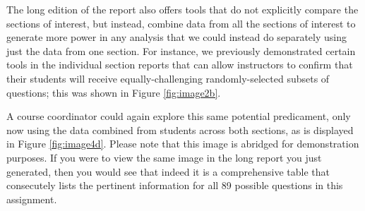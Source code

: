 \documentclass{article}\usepackage[]{graphicx}\usepackage[]{color}
\numberwithin{equation}{section} %
\begin{document}
\begin{center}
\captionsetup{width=0.55\textwidth}
\label{fig:image4c}
\end{center}

The long edition of the report also offers tools that do not explicitly compare the sections of interest, but instead, combine data from all the sections of interest to generate more power in any analysis that we could instead do separately using just the data from one section. For instance, we previously demonstrated certain tools in the individual section reports that can allow instructors to confirm that their students will receive equally-challenging randomly-selected subsets of questions; this was shown in Figure \ref{fig:image2b}.

A course coordinator could again explore this same potential predicament, only now using the data combined from students across both sections, as is displayed in Figure \ref{fig:image4d}. Please note that this image is abridged for demonstration purposes. If you were to view the same image in the long report you just generated, then you would see that indeed it is a comprehensive table that consecutely lists the pertinent information for all 89 possible questions in this assignment.
\end{document}
